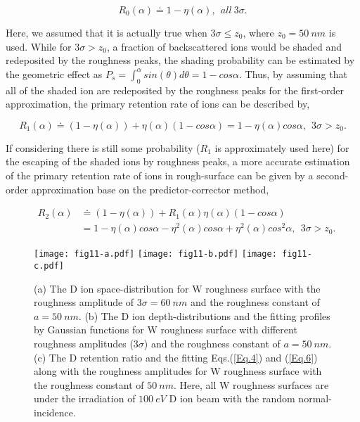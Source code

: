 \noindent
\begin{equation}
R_0 \left( \alpha \right) \doteq 1 - \eta \left(\alpha \right), ~~all~3 \sigma. \label{Eq.4}
\end{equation}

\noindent Here, we assumed that it is actually true when $3 \sigma \leq z_0$, where $z_0 = 50~nm$ is used. While for $3 \sigma > z_0$, a fraction of backscattered ions would be shaded and redeposited by the roughness peaks, the shading probability can be estimated by the geometric effect as $P_s = \int_{0}^{\alpha} sin \left( \theta \right) d \theta = 1 - cos \alpha$. Thus, by assuming that all of the shaded ion are redeposited by the roughness peaks for the first-order approximation, the primary retention rate of ions can be described by,

\noindent
\begin{equation}
R_1 \left( \alpha \right) \doteq \left( 1 - \eta \left( \alpha \right) \right) + \eta \left( \alpha \right) \left( 1 - cos \alpha \right) = 1 - \eta \left( \alpha \right) cos \alpha, ~~ 3 \sigma > z_0. \label{Eq.5}
\end{equation}

\noindent If considering there is still some probability ($R_1$ is approximately used here) for the escaping of the shaded ions by roughness peaks, a more accurate estimation of the primary retention rate of ions in rough-surface can be given by a second-order approximation base on the predictor-corrector method,

\noindent
\begin{eqnarray}
& R_2 \left( \alpha \right) & \doteq \left( 1 - \eta \left( \alpha \right) \right) + R_1 \left( \alpha \right) \eta \left( \alpha \right) \left( 1 - cos \alpha \right) \nonumber \\
&&{} = 1 - \eta \left( \alpha \right) cos \alpha - \eta ^2 \left( \alpha \right) cos \alpha + \eta^2 \left( \alpha \right) cos^2 \alpha, ~~ 3 \sigma > z_0. \label{Eq.6}
\end{eqnarray}

\begin{figure}[!ht]\centering
\texttt{[image: fig11-a.pdf]}
\texttt{[image: fig11-b.pdf]}
\texttt{[image: fig11-c.pdf]}
\caption{(a) The D ion space-distribution for W roughness surface with the roughness amplitude of $3 \sigma = 60~nm$ and the roughness constant of $a = 50~nm$. (b) The D ion depth-distributions and the fitting profiles by Gaussian functions for W roughness surface with different roughness amplitudes ($3 \sigma$) and the roughness constant of $a = 50~nm$. (c) The D retention ratio and the fitting Eqs.(\ref{Eq.4}) and (\ref{Eq.6}) along with the roughness amplitudes for W roughness surface with the roughness constant of $50~nm$. Here, all W roughness surfaces are under the irradiation of $100~eV$ D ion beam with the random normal-incidence.} \label{Fig.11}
\end{figure}

